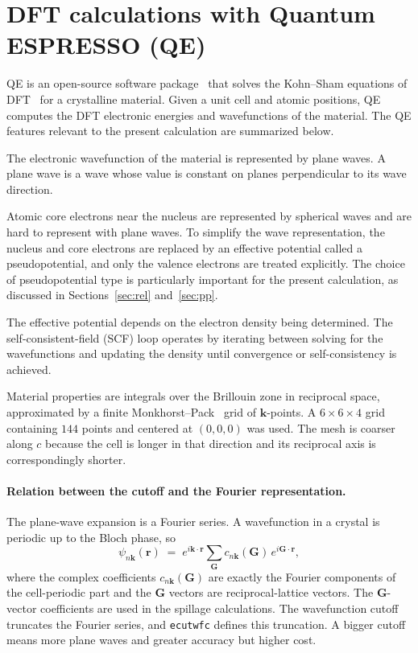 \documentclass[11pt]{article}
\newcommand{\kk}{\mathbf{k}}
\newcommand{\GG}{\mathbf{G}}
\begin{document}
\section{DFT calculations with Quantum ESPRESSO (QE)}\label{sec:qe}

QE is an open-source software package~\cite{giannozzi2009,giannozzi2017} that solves the Kohn--Sham
equations of DFT~\cite{hohenberg1964,kohn1965} for a crystalline material. Given a unit cell and
atomic positions, QE computes the DFT electronic energies and wavefunctions of the material. The QE
features relevant to the present calculation are summarized below.

\begin{description}[leftmargin=1.4em,style=nextline]
\item[Plane-wave basis.] The electronic wavefunction of the material is represented by plane waves.
A plane wave is a wave whose value is constant on planes perpendicular to its wave direction.
\item[Pseudopotentials.] Atomic core electrons near the nucleus are represented by spherical waves
and are hard to represent with plane waves. To simplify the wave representation, the nucleus and
core electrons are replaced by an effective potential called a pseudopotential, and only the valence
electrons are treated explicitly. The choice of pseudopotential type is particularly important for
the present calculation, as discussed in Sections~\ref{sec:rel} and~\ref{sec:pp}.
\item[The SCF loop.] The effective potential depends on the electron density being determined. The
self-consistent-field (SCF) loop operates by iterating between solving for the wavefunctions and
updating the density until convergence or self-consistency is achieved.
\item[$\kk$-points.] Material properties are integrals over the Brillouin zone in reciprocal space,
approximated by a finite Monkhorst--Pack~\cite{monkhorst1976} grid of $\kk$-points. A
$6\times6\times4$ grid containing $144$ points and centered at $(0,0,0)$ was used. The mesh is
coarser along $c$ because the cell is longer in that direction and its reciprocal axis is
correspondingly shorter.
\end{description}

\paragraph{Relation between the cutoff and the Fourier representation.} The plane-wave expansion is
a Fourier series. A wavefunction in a crystal is periodic up to the Bloch phase, so
\begin{equation}
  \psi_{n\kk}(\mathbf r)\;=\;e^{i\kk\cdot\mathbf r}\sum_{\GG}c_{n\kk}(\GG)\,e^{i\GG\cdot\mathbf r},
  \label{eq:plane-wave}
\end{equation}
where the complex coefficients $c_{n\kk}(\GG)$ are exactly the Fourier components of the
cell-periodic part and the $\GG$ vectors are reciprocal-lattice vectors. The $\GG$-vector
coefficients are used in the spillage calculations. The wavefunction cutoff truncates the Fourier
series, and \texttt{ecutwfc} defines this truncation. A bigger cutoff means more plane waves and
greater accuracy but higher cost.
\end{document}
